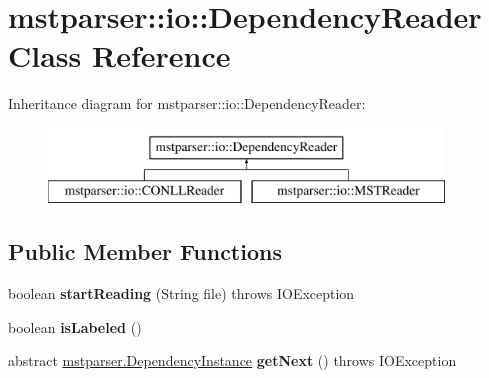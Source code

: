 \hypertarget{classmstparser_1_1io_1_1DependencyReader}{
\section{mstparser::io::DependencyReader Class Reference}
\label{classmstparser_1_1io_1_1DependencyReader}
}
Inheritance diagram for mstparser::io::DependencyReader:\begin{figure}[H]
\begin{center}
\leavevmode
\includegraphics[height=2cm]{classmstparser_1_1io_1_1DependencyReader}
\end{center}
\end{figure}
\subsection*{Public Member Functions}
\begin{DoxyCompactItemize}
\item 
\hypertarget{classmstparser_1_1io_1_1DependencyReader_aed6d91d39e122754719d7e3d01f05026}{
boolean {\bfseries startReading} (String file)  throws IOException }
\label{classmstparser_1_1io_1_1DependencyReader_aed6d91d39e122754719d7e3d01f05026}

\item 
\hypertarget{classmstparser_1_1io_1_1DependencyReader_abcd3871e3600780a209d92988627df31}{
boolean {\bfseries isLabeled} ()}
\label{classmstparser_1_1io_1_1DependencyReader_abcd3871e3600780a209d92988627df31}

\item 
\hypertarget{classmstparser_1_1io_1_1DependencyReader_af36eda4b82f189044bcfe6364458c116}{
abstract \hyperlink{classmstparser_1_1DependencyInstance}{mstparser.DependencyInstance} {\bfseries getNext} ()  throws IOException}
\label{classmstparser_1_1io_1_1DependencyReader_af36eda4b82f189044bcfe6364458c116}

\end{DoxyCompactItemize}

